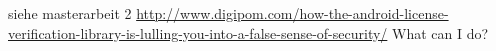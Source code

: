 siehe masterarbeit 2
\url{http://www.digipom.com/how-the-android-license-verification-library-is-lulling-you-into-a-false-sense-of-security/} What can I do?
\newline
